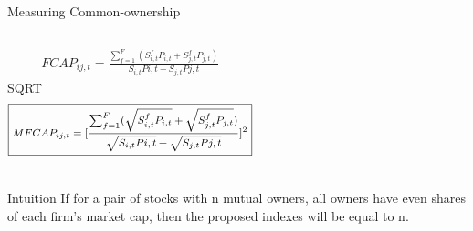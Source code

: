 \documentclass[handout]{beamer}
\begin{document}
%					
%					
%					
%					
%					
%					
%					
%					
%					
%					
%				

	\begin{frame}{Measuring Common-ownership}\label{Intuition}
				\begin{columns}
			\centering  
						\cite{AntonPolk}
								\begin{align*}
									\boxed{FCAP_{ij,t} = \frac{\sum_{f = 1}^{F} (S^f_{i,t}P_{i,t}+S^f_{j,t}P_{j,t})}{S_{i,t}P{i,t} + S_{j,t}P{j,t}}}
								\end{align*} 
			\centering
			SQRT
						\begin{align*}
						\footnotesize	\boxed{    MFCAP_{ij,t} =           [\frac{\sum_{f =1}^{F}(\sqrt{S^f_{i,t}P_{i,t}}+\sqrt{S^f_{j,t}P_{j,t}})}{\sqrt{S_{i,t}P{i,t}} + \sqrt{S_{j,t}P{j,t}}}]^2 }
						\end{align*}     				         
		\end{columns}
	\pause
		\begin{block}{Intuition}
			If for a pair of stocks with n mutual owners, all owners have even shares of each firm's market cap, then the proposed indexes will be equal to n.
			\hyperlink{Proof}{}
		\end{block}
		\begin{table}[htbp]
								\centering
								\resizebox{0.8\textwidth}{!}
								{
									  }          
							\end{table}
	\end{frame}
	
\end{document}
